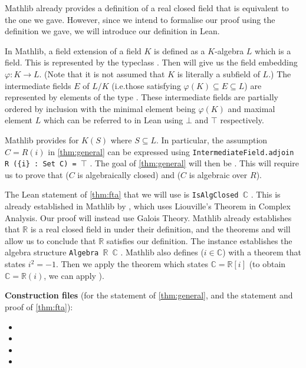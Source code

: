 \documentclass{article}
\newcommand{\leanmath}[1]{%
  \begingroup
  \setlength{\fboxsep}{1pt}%
  \colorbox{leanbg}{\texttt{#1}}%
  \endgroup
}
\begin{document}
Mathlib already provides a definition of a real closed field  that is equivalent to the one we gave. However, since we intend to formalise our proof using the definition we gave, we will introduce our definition in Lean.

In Mathlib, a field extension of a field $K$ is defined as a $K$-algebra $L$ which is a field. This is represented by the typeclass . Then  will give us the field embedding $\varphi:K\to L$. (Note that it is not assumed that $K$ is literally a subfield of $L$.) The intermediate fields $E$ of $L/K$ (i.e.\@ those satisfying $\varphi(K)\subseteq E\subseteq L$) are represented by elements of the type . These intermediate fields are partially ordered by inclusion with the minimal element being $\varphi(K)$ and maximal element $L$ which can be referred to in Lean using \leanmath{$\bot$} and \leanmath{$\top$} respectively.

Mathlib provides  for $K(S)$ where $S\subseteq L$. In particular, the assumption $C=R(i)$ in \cref{thm:general} can be expressed using \leanmath{IntermediateField.adjoin R (\{i\} : Set C) = $\top$}. The goal of \cref{thm:general} will then be . This will require us to prove that  ($C$ is algebraically closed) and  ($C$ is algebraic over $R$).

The Lean statement of \cref{thm:fta} that we will use is \leanmath{IsAlgClosed $\mathbb{C}$}. This is already established in Mathlib by , which uses Liouville's Theorem in Complex Analysis. Our proof will instead use Galois Theory. Mathlib already establishes that $\mathbb{R}$ is a real closed field in  under their definition, and the theorems  and  will allow us to conclude that $\mathbb{R}$ satisfies our definition. The instance  establishes the algebra structure \leanmath{Algebra $\mathbb{R}$ $\mathbb{C}$}. Mathlib also defines  ($i\in \mathbb{C}$) with a theorem  that states $i^2=-1$. Then we apply the theorem  which states $\mathbb{C}=\mathbb{R}[i]$ (to obtain $\mathbb{C}=\mathbb{R}(i)$, we can apply ).

\textbf{Construction files} (for the statement of \cref{thm:general}, and the statement and proof of \cref{thm:fta}):
\begin{itemize}[nosep]
\item {}
\item {}
\item {}
\item {}
\end{itemize}
\end{document}

